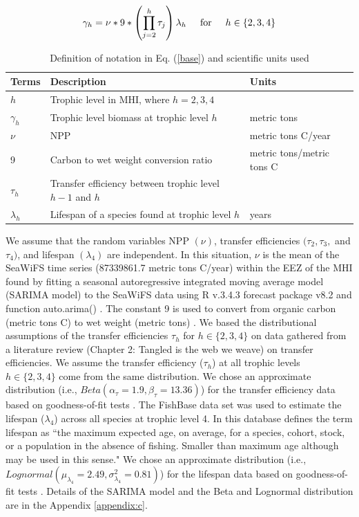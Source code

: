 \documentclass[oneside,12pt,final]{sty/ucthesis-CA2012}
\let\cite\citep                             %
\begin{document}
\begin{mainmatter}
\begin{equation} \label{base}
\gamma_h = \nu * 9 * \left( \prod_{j=2}^{h} \tau_j \right) \lambda_h \hspace{5mm} \text{for} \hspace{5mm} h \in \{2, 3, 4\}
\end{equation}

\begin{table}[H]
\centering
\caption{Definition of notation in Eq. (\ref{base}) and scientific units used}
\begin{tabular}{l|l|l}
  \hline \small
 Terms & Description & Units  \\ 
   \hline
   $h$ & Trophic level in MHI, where $h = 2,3,4$  & \\
   $\gamma_h$ &  Trophic level biomass at trophic level $h$ & metric tons  \\
   $\nu$ & NPP & metric tons C/year \\
   9 & Carbon to wet weight conversion ratio & metric tons/metric tons C \\
   $\tau_{h}$ & Transfer efficiency between trophic level $h-1$ and $h$ &   \\  
   $\lambda_h$ & Lifespan of a species found at trophic level $h$ & years \\
   \hline
\end{tabular} 
\label{description}
\end{table}

We assume that the random variables NPP $(\nu)$, transfer efficiencies $(\tau_2, \tau_3,$ and $\tau_4)$, and lifespan $(\lambda_4)$ are independent. In this situation, $\nu$ is the mean of the SeaWiFS time series (87339861.7 metric tons C/year) within the EEZ of the MHI found by fitting a seasonal autoregressive integrated moving average model (SARIMA model) to the SeaWiFS data using R v.3.4.3 \cite{Rcite} forecast package v8.2 and function auto.arima() \cite{forecast1, forecast2}. The constant 9 is used to convert from organic carbon (metric tons C) to wet weight (metric tons) \cite{strathmann1967estimating, pauly1995primary, chassot2010global}. We based the distributional assumptions of the transfer efficiencies $\tau_h$ for $h \in \{2, 3, 4\}$ on data gathered from a literature review (Chapter 2: Tangled is the web we weave) on transfer efficiencies. We assume the transfer efficiency ($\tau_h$) at all trophic levels $h \in \{2, 3, 4\}$ come from the same distribution. We chose an approximate distribution (i.e., $Beta(\alpha_\tau=1.9, \beta_{\tau}=13.36)$) for the transfer efficiency data based on goodness-of-fit tests \cite{fitdistrplus}. The \citet{fishbase} FishBase data set was used to estimate the lifespan ($\lambda_4$) across all species at trophic level 4. In this database \citet{fishbase} defines the term lifespan as ``the maximum expected age, on average, for a species, cohort, stock, or a population in the absence of fishing. Smaller than maximum age although may be used in this sense." We chose an approximate distribution (i.e., $Lognormal(\mu_{\lambda_4}=2.49, \sigma^2_{\lambda_4}=0.81)$) for the lifespan data based on goodness-of-fit tests \cite{fitdistrplus}. Details of the SARIMA model and the Beta and Lognormal distribution are in the Appendix \ref{appendix:c}. 


\end{mainmatter}
\end{document}
